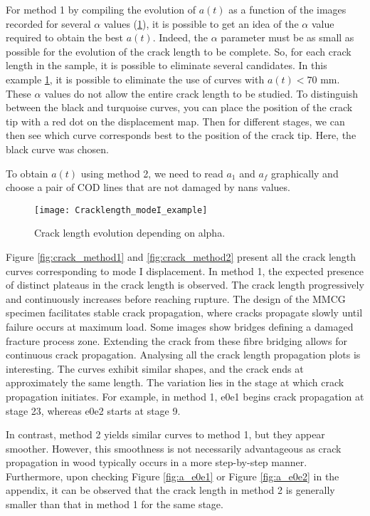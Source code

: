 For method 1 by compiling the evolution of $a(t)$ as a function of the images recorded for several $\alpha$ values (\ref{fig:Cracklength_modeI_example}), it is possible to get an idea of the $\alpha$ value required to obtain the best $a(t)$. Indeed, the $\alpha$ parameter must be as small as possible for the evolution of the crack length to be complete. So, for each crack length in the sample, it is possible to eliminate several candidates. In this example \ref{fig:Cracklength_modeI_example}, it is possible to eliminate the use of curves with $a(t)<70$ mm. These $\alpha$ values do not allow the entire crack length to be studied. To distinguish between the black and turquoise curves, you can place the position of the crack tip with a red dot on the displacement map. Then for different stages, we can then see which curve corresponds best to the position of the crack tip. Here, the black curve was chosen.

To obtain $a(t)$ using method 2, we need to read $a_1$ and $a_f$ graphically and choose a pair of COD lines that are not damaged by nans values.

\begin{figure}[H]
	\centering
	\texttt{[image: Cracklength\_modeI\_example]}
	\caption{Crack length evolution depending on alpha.}
	\label{fig:Cracklength_modeI_example}
\end{figure}

Figure \ref{fig:crack_method1} and \ref{fig:crack_method2} present all the crack length curves corresponding to mode I displacement. In method 1, the expected presence of distinct plateaus in the crack length is observed. The crack length progressively and continuously increases before reaching rupture. The design of the MMCG specimen facilitates stable crack propagation, where cracks propagate slowly until failure occurs at maximum load. Some images show bridges defining a damaged fracture process zone. Extending the crack from these fibre bridging allows for continuous crack propagation. Analysing all the crack length propagation plots is interesting. The curves exhibit similar shapes, and the crack ends at approximately the same length. The variation lies in the stage at which crack propagation initiates. For example, in method 1, e0e1 begins crack propagation at stage 23, whereas e0e2 starts at stage 9.

In contrast, method 2 yields similar curves to method 1, but they appear smoother. However, this smoothness is not necessarily advantageous as crack propagation in wood typically occurs in a more step-by-step manner. Furthermore, upon checking Figure \ref{fig:a_e0e1} or Figure \ref{fig:a_e0e2} in the appendix, it can be observed that the crack length in method 2 is generally smaller than that in method 1 for the same stage.

